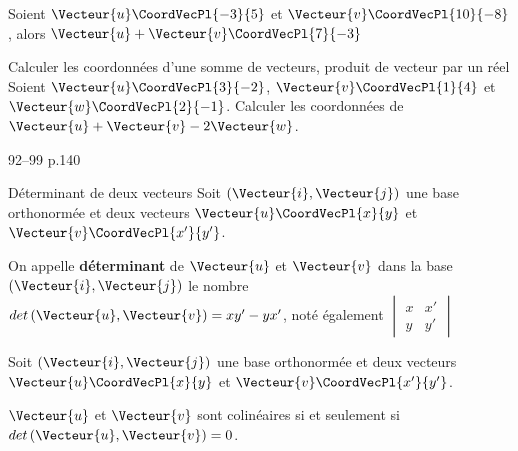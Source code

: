 \documentclass[a4paper]{article}
\begin{document}
\begin{example}{}{}
  Soient $\Vecteur{u}\CoordVecPl{-3}{5}$  et $\Vecteur{v}\CoordVecPl{10}{-8}$, alors $\Vecteur{u}+\Vecteur{v}\CoordVecPl{7}{-3}$
\end{example}


\begin{methode*}{Calculer les coordonnées d'une somme de vecteurs, produit de vecteur par un réel}{}
  Soient $\Vecteur{u}\CoordVecPl{3}{-2}$, $\Vecteur{v}\CoordVecPl{1}{4}$ et $\Vecteur{w}\CoordVecPl{2}{-1}$.
  Calculer les coordonnées de $\Vecteur{u}+\Vecteur{v}-2\Vecteur{w}$.
 
   \vspace{2cm}
 
   \hfill{}
 \end{methode*}

 \begin{exercices}{}{}
  92--99 p.140
  \end{exercices}


 \pagebreak

\begin{definition}{Déterminant de deux vecteurs}{}
Soit $\left(\Vecteur{i},\Vecteur{j}\right)$ une base orthonormée et deux vecteurs $\Vecteur{u}\CoordVecPl{x}{y}$ et $\Vecteur{v}\CoordVecPl{x'}{y'}$.

On appelle \textbf{déterminant} de $\Vecteur{u}$ et $\Vecteur{v}$ dans la base $\left(\Vecteur{i},\Vecteur{j}\right)$ le nombre $det\left(\Vecteur{u},\Vecteur{v}\right)=xy'-yx'$, noté également 
$\begin{vmatrix} 
  x & x' \\ 
  y & y' 
  \end{vmatrix} $
\end{definition}

\begin{propriete}{}{}
  Soit $\left(\Vecteur{i},\Vecteur{j}\right)$ une base orthonormée et deux vecteurs $\Vecteur{u}\CoordVecPl{x}{y}$ et $\Vecteur{v}\CoordVecPl{x'}{y'}$.

  $\Vecteur{u}$ et $\Vecteur{v}$ sont colinéaires si et seulement si $det\left(\Vecteur{u},\Vecteur{v}\right)=0$.
\end{propriete}
\end{document}
